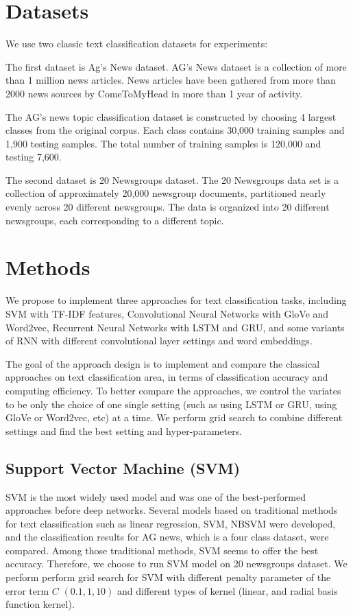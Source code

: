 \documentclass{article}
\begin{document}
\section{Datasets}

We use two classic text classification datasets for experiments:

The first dataset is Ag's News dataset. AG's News dataset is a collection of more than 1 million news articles. News articles have been gathered from more than 2000  news sources by ComeToMyHead in more than 1 year of activity.

The AG's news topic classification dataset is constructed by choosing 4 largest classes from the original corpus. Each class contains 30,000 training samples and 1,900 testing samples. The total number of training samples is 120,000 and testing 7,600.

The second dataset is 20 Newsgroups dataset. The 20 Newsgroups data set is a collection of approximately 20,000 newsgroup documents, partitioned nearly evenly across 20 different newsgroups. The data is organized into 20 different newsgroups, each corresponding to a different topic.


\section{Methods}
We propose to implement three approaches for text classification tasks, including SVM with TF-IDF features, Convolutional Neural Networks with GloVe and Word2vec, Recurrent Neural Networks with LSTM and GRU, and some variants of RNN with different convolutional layer settings and word embeddings. 

The goal of the approach design is to implement and compare the classical approaches on text classification area, in terms of classification accuracy and computing efficiency. To better compare the approaches, we control the variates to be only the choice of one single setting (such as using LSTM or GRU, using GloVe or Word2vec, etc) at a time. We perform grid search to combine different settings and find the best setting and hyper-parameters.



\subsection{Support Vector Machine (SVM)}
 SVM is the most widely used model and was one of the best-performed approaches before deep networks. Several models based on traditional methods for text classification such as linear regression, SVM, NBSVM  were developed, and the classification results for AG news, which is a four class dataset, were compared. Among those traditional methods, SVM seems to offer the best accuracy. Therefore, we choose to run SVM model on 20 newsgroups dataset.  We perform perform grid search for SVM with different penalty parameter of the error term $C$ $(0.1, 1, 10)$ and different types of kernel (linear, and radial basis function kernel). 
\end{document}
